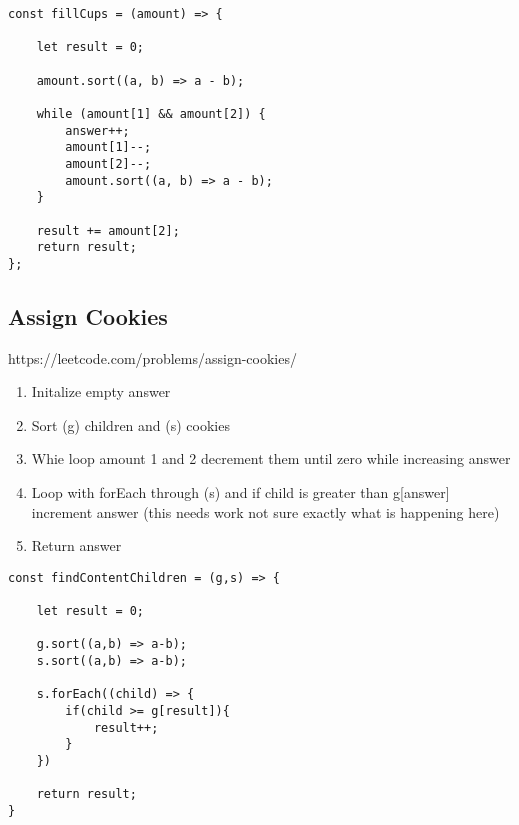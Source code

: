 \documentclass[10pt]{article}
\begin{document}
\begin{lstlisting}[title=Solution fillCups, captionpos=t]
const fillCups = (amount) => {
    
    let result = 0;

    amount.sort((a, b) => a - b);
    
    while (amount[1] && amount[2]) {
        answer++;
        amount[1]--;
        amount[2]--;
        amount.sort((a, b) => a - b);
    }
    
    result += amount[2];
    return result;
};
\end{lstlisting}
\medskip %









\pagebreak %
\medskip 
\subsection{Assign Cookies}
https://leetcode.com/problems/assign-cookies/

\begin{enumerate}
	\item Initalize empty answer
	\item Sort (g) children and (s) cookies 
	\item Whie loop amount 1 and 2 decrement them until zero while increasing answer
	\item Loop with forEach through (s) and if  child is greater than g[answer]  increment answer (this needs work not sure exactly what is happening here)
	\item Return answer
\end{enumerate}



\begin{lstlisting}[title=Solution findContentChildren, captionpos=t]
const findContentChildren = (g,s) => {
    
    let result = 0;
    
    g.sort((a,b) => a-b);
    s.sort((a,b) => a-b);
    
    s.forEach((child) => {
        if(child >= g[result]){
            result++;
        }
    })
    
    return result;
}
\end{lstlisting}
\medskip %
\end{document}
